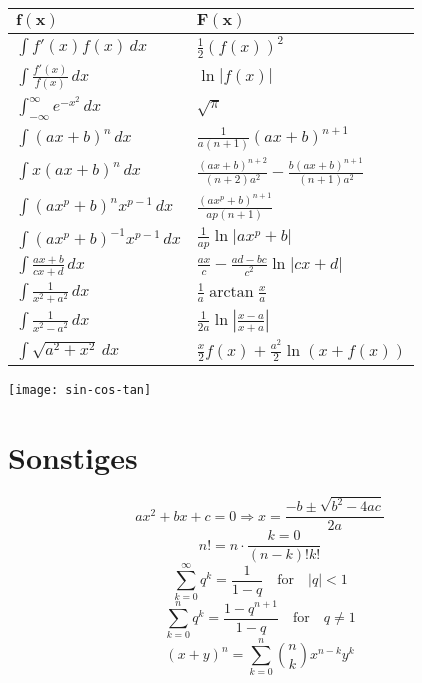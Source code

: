 \begin{center}
  \begin{tabularx}{\linewidth}{>{\centering\arraybackslash}X>{\centering\arraybackslash}X}
    $\mathbf{f(x)}$                        & $\mathbf{F(x)}$                                                  \\
    \midrule
    $\int f'(x) f(x) \, dx$                & $\frac{1}{2}(f(x))^2$                                            \\
    $\int \frac{f'(x)}{f(x)} \, dx$        & $\ln|f(x)|$                                                      \\
    $\int_{-\infty}^\infty e^{-x^2} \, dx$ & $\sqrt{\pi}$                                                     \\
    $\int (ax+b)^n \, dx$                  & $\frac{1}{a(n+1)}(ax+b)^{n+1}$                                   \\
    $\int x(ax+b)^n \, dx$                 & $\frac{(ax+b)^{n+2}}{(n+2)a^2} - \frac{b(ax+b)^{n+1}}{(n+1)a^2}$ \\
    $\int (ax^p+b)^n x^{p-1} \, dx$        & $\frac{(ax^p+b)^{n+1}}{ap(n+1)}$                                 \\
    $\int (ax^p + b)^{-1} x^{p-1} \, dx$   & $\frac{1}{ap} \ln |ax^p + b|$                                    \\
    $\int \frac{ax+b}{cx+d} \, dx$         & $\frac{ax}{c} - \frac{ad-bc}{c^2} \ln |cx +d|$                   \\
    $\int \frac{1}{x^2+a^2} \, dx$         & $\frac{1}{a} \arctan \frac{x}{a}$                                \\
    $\int \frac{1}{x^2 - a^2} \, dx$       & $\frac{1}{2a} \ln\left| \frac{x-a}{x+a} \right|$                 \\
    $\int \sqrt{a^2+x^2} \, dx $           & $\frac{x}{2}f(x) + \frac{a^2}{2}\ln(x+f(x))$                     \\
    \bottomrule
  \end{tabularx}
\end{center}

\texttt{[image: sin-cos-tan]}

\section*{Sonstiges}
\[ax^2 + bx + c = 0 \Rightarrow x = \frac{-b \pm \sqrt{b^2 - 4ac}}{2a}\]
\[n! = n \cdot \frac{k=0}{(n - k)!k!}\]
\[\sum_{k=0}^\infty q^k = \frac{1}{1 - q} \quad \text{for} \quad |q| < 1\]
\[\sum_{k=0}^n q^k = \frac{1 - q^{n+1}}{1 - q} \quad \text{for} \quad q \neq 1\]
\[(x + y)^n = \sum_{k=0}^n \binom{n}{k} x^{n-k} y^k\]
\newpage
